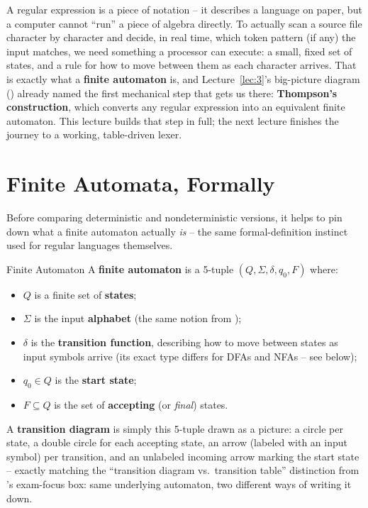 \documentclass[full-course-notes.tex]{subfiles}
\begin{document}
\dbtag A regular expression is a piece of notation -- it describes a language on paper, but a
computer cannot ``run'' a piece of algebra directly. To actually scan a source file character
by character and decide, in real time, which token pattern (if any) the input matches, we need
something a processor can execute: a small, fixed set of states, and a rule for how to move
between them as each character arrives. That is exactly what a \textbf{finite automaton} is,
and Lecture~\ref{lec:3}'s big-picture diagram () already named the
first mechanical step that gets us there: \textbf{Thompson's construction}, which converts any
regular expression into an equivalent finite automaton. This lecture builds that step in full;
the next lecture finishes the journey to a working, table-driven lexer.

\section{Finite Automata, Formally}
\label{sec:l5-fa-formal}

\dbtag Before comparing deterministic and nondeterministic versions, it helps to pin down what
a finite automaton actually \emph{is} -- the same formal-definition instinct
 used for regular languages themselves.

\begin{defbox}{Finite Automaton}
A \textbf{finite automaton} is a 5-tuple $(Q, \Sigma, \delta, q_0, F)$ where:
\begin{itemize}
  \item $Q$ is a finite set of \textbf{states};
  \item $\Sigma$ is the input \textbf{alphabet} (the same notion from
  );
  \item $\delta$ is the \textbf{transition function}, describing how to move between states as
  input symbols arrive (its exact type differs for DFAs and NFAs -- see below);
  \item $q_0 \in Q$ is the \textbf{start state};
  \item $F \subseteq Q$ is the set of \textbf{accepting} (or \emph{final}) states.
\end{itemize}
\end{defbox}

A \textbf{transition diagram} is simply this 5-tuple drawn as a picture: a circle per state, a
double circle for each accepting state, an arrow (labeled with an input symbol) per transition,
and an unlabeled incoming arrow marking the start state -- exactly matching the ``transition
diagram vs.\ transition table'' distinction from 's exam-focus box:
same underlying automaton, two different ways of writing it down.
\end{document}
